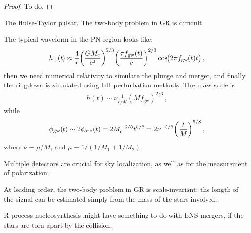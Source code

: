 \documentclass[main.tex]{subfiles}
\begin{document}
\begin{proof}
To do.
\end{proof}

The Hulse-Taylor pulsar. 
The two-body problem in GR is difficult. 

The typical waveform in the PN region looks like: 
%
\begin{align}
h_{+} (t) \approx \frac{4}{r} \qty( \frac{GM_c}{c^2})^{5/3} \qty( \frac{\pi f_{\text{gw}}(t)}{c})^{2/3} \cos( 2 \pi f _{\text{gw}} (t) t)
\,,
\end{align}
%
then we need numerical relativity to simulate the plunge and merger, and finally the ringdown is simulated using BH perturbation methods.
The mass scale is 
%
\begin{align}
h(t) \sim \nu \frac{1}{r / M} (M f _{\text{gw}})^{2/3}
\,,
\end{align}
%
while 
%
\begin{align}
\phi _{\text{gw}}(t) \sim 2 \phi _{\text{orb}}(t) = 2 M_c^{-5/8} t^{5/8} = 2 \nu^{-3/8} \qty( \frac{t}{M})^{5/8}
\,,
\end{align}
%
 where \(\nu = \mu / M\), and \(\mu = 1/(1/M_1 + 1/M_2 )\).
 
Multiple detectors are crucial for sky localization, as well as for the measurement of polarization. 

At leading order, the two-body problem in GR is scale-invariant: the length of the signal can be estimated simply from the mass of the stars involved. 

R-process nucleosynthesis might have something to do with BNS mergers, if the stars are torn apart by the collision. 
\end{document}
